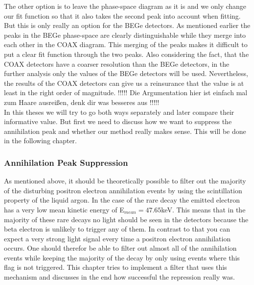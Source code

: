 The other option is to leave the phase-space diagram as it is and we only change our fit function so that it also takes the second peak into account when fitting.
But this is only really an option for the BEGe detectors.
As mentioned earlier the peaks in the BEGe phase-space are clearly distinguishable while they merge into each other in the COAX diagram.
This merging of the peaks makes it difficult to put a clear fit function through the two peaks.
Also considering the fact, that the COAX detectors have a coarser resolution than the BEGe detectors, in the further analysis only the values of the BEGe detectors will be used.
Nevertheless, the results of the COAX detectors can give us a reinsurance that the value is at least in the right order of magnitude.
!!!!! Die Argumentation hier ist einfach mal zum Haare ausreißen, denk dir was besseres aus !!!!!
\\ 

In this theses we will try to go both ways separately and later compare their informative value.
But first we need to discuss how we want to suppress the annihilation peak and whether our method really makes sense. 
This will be done in the following chapter.
\\


\subsubsection{Annihilation Peak Suppression}
\label{sec:APS}

As mentioned above, it should be theoretically possible to filter out the majority of the disturbing positron electron annihilation events by using the scintillation property of the liquid argon.
In the case of the rare  decay the emitted electron has a very low mean kinetic energy of E\(_{mean}=47.65\)keV.
This means that in the majority of these rare decays no light should be seen in the detectors because the beta electron is unlikely to trigger any of them.
In contrast to that you can expect a very strong light signal every time a positron electron annihilation occurs. 
One should therefor be able to filter out almost all of the annihilation events while keeping the majority of the  decay by only using events where this flag is not triggered.
This chapter tries to implement a filter that uses this mechanism and discusses in the end how successful the repression really was.
\\


